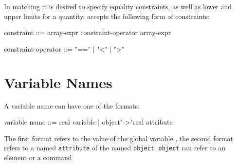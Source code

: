 In matching it is desired to specify equality constraints,
as well as lower and upper limits for a quantity.
\opal accepts the following form of constraints:
\begin{example}
constraint          ::= array-expr constraint-operator array-expr

constraint-operator ::= "==" | "<" | ">"
\end{example}

\section{Variable Names}
\label{sec:areference}
A variable name can have one of the formats:
\begin{example}
   variable name ::= real variable |
                     object"->"real attribute
\end{example}
The first format refers to the value of the
{global variable} ,
the second format refers to a named \texttt{attribute} of the named
\texttt{object}.
\texttt{object} can refer to an element or a command

